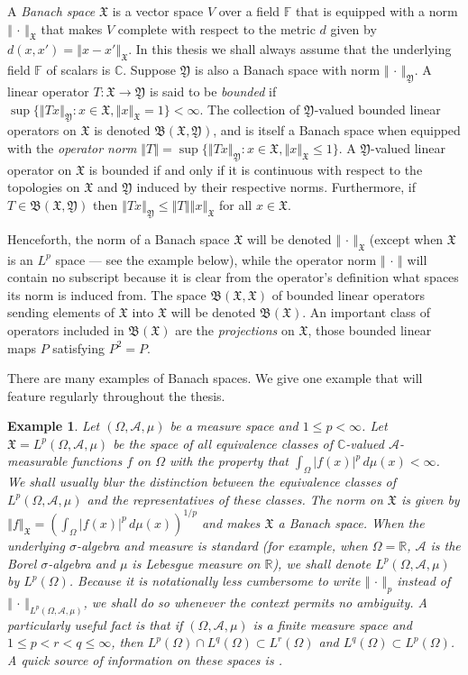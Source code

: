 \documentclass[12pt]{UNSWthesis}
\newcommand{\R}{\mathbb{R}}
\newcommand{\C}{\mathbb{C}}
\newcommand{\F}{\mathbb{F}}
\newcommand{\B}{\mathfrak{B}}
\newcommand{\X}{\mathfrak{X}}
\newcommand{\Y}{\mathfrak{Y}}
\newcommand{\A}{\mathcal{A}}
\def\norm#1{\left \Vert #1 \right \Vert}
\newtheorem{example}[theorem]{Example}
\numberwithin{equation}{section}
\begin{document}
A {\em Banach space} $\X$ is a vector space $V$ over a field $\F$ that is 
equipped with a norm
$\norm{\,\cdot\,}_{\X}$ that makes $V$ complete with respect to the metric $d$
given by $d(x,x')=\norm{x-x'}_{\X}$. In this thesis we shall always assume that
the
underlying field $\F$ of scalars is $\C$. Suppose $\Y$ is also a Banach space
with norm $\norm{\,\cdot\,}_{\Y}$. A linear operator
$T:\X\rightarrow\Y$ is said to be {\em bounded} if
$\sup\{\norm{Tx}_{\Y}:x\in\X,\norm{x}_{\X}=1\}<\infty$. The collection of
$\Y$-valued bounded linear operators on $\X$ is denoted $\B(\X,\Y)$, and is
itself a Banach space when equipped with the {\em operator norm}
$\norm{T}=\sup\{\norm{Tx}_{\Y}:x\in\X,\norm{x}_{\X}\leq 1\}$. A $\Y$-valued
linear
operator on $\X$ is bounded if and only if it is continuous with respect to the
topologies on $\X$ and $\Y$ induced by their respective norms. Furthermore, if
$T\in\B(\X,\Y)$ then $\norm{Tx}_{\Y}\leq\norm{T}\norm{x}_{\X}$ for all $x\in\X$.

Henceforth, the norm of a Banach space $\X$ will be denoted
$\norm{\,\cdot\,}_{\X}$ (except when $\X$ is an $L^p$ space --- see the
example below), while the operator norm $\norm{\,\cdot\,}$ will
contain no subscript because it is clear from the operator's definition what
spaces its norm is induced from. The space $\B(\X,\X)$ of bounded linear
operators sending elements of $\X$ into $\X$ will be denoted $\B(\X)$. An
important class of operators included in $\B(\X)$ are the {\em projections} on
$\X$, those bounded linear maps $P$ satisfying $P^2=P$.

There are many examples of Banach spaces. We give one example that will feature
regularly throughout the thesis.

\begin{example}\label{L^p example}
Let $(\Omega,\A,\mu)$ be a measure space and $1\leq p<\infty$. Let
$\X=L^p(\Omega,\A,\mu)$ be the space of all equivalence classes of
$\C$-valued $\A$-measurable functions $f$ on $\Omega$ with the property that
$\int_{\Omega}|f(x)|^p\,d\mu(x)<\infty$. We shall usually blur the distinction
between the equivalence classes of $L^p(\Omega,\A,\mu)$ and the representatives
of these classes. The norm on $\X$ is given by
$\norm{f}_{\X}=(\int_{\Omega}|f(x)|^p\,d\mu(x))^{1/p}$ and
makes $\X$ a Banach space. When the underlying $\sigma$-algebra and measure is
standard (for example, when $\Omega=\R$, $\A$ is the Borel $\sigma$-algebra
and $\mu$ is Lebesgue measure on $\R$), we shall denote
$L^p(\Omega,\A,\mu)$ by $L^p(\Omega)$. 
Because it
is notationally less cumbersome to write $\norm{\,\cdot\,}_p$ instead of
$\norm{\,\cdot\,}_{L^p(\Omega,\A,\mu)}$, we shall do so whenever the context
permits no ambiguity. A particularly useful fact is that if $(\Omega,\A,\mu)$ is
a finite measure space and $1\leq p<r<q\leq\infty$, then
$L^p(\Omega)\cap L^q(\Omega)\subset L^r(\Omega)$ and
$L^q(\Omega)\subset L^p(\Omega)$. A quick source of information on these spaces
is \cite[\S 6.4]{Pedersen}.
\end{example}
\end{document}

